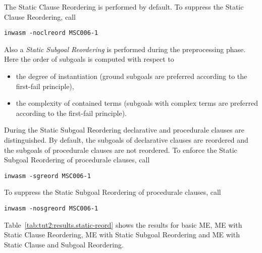The Static Clause Reordering is performed by default. To suppress the
Static Clause Reordering, call
\begin{center}
\begin{verbatim}
inwasm -noclreord MSC006-1
\end{verbatim}
\end{center}

Also a {\em Static Subgoal Reordering\/} is performed during the
preprocessing phase. Here the order of subgoals is computed with
respect to  
\begin{itemize}
\item the degree of instantiation (ground subgoals are preferred
	according to the first-fail principle),
\item the complexity of contained terms (subgoals with complex
	terms are preferred according to the first-fail principle).  
\end{itemize}

During the Static Subgoal Reordering declarative and procedurale
clauses are distinguished. By default, the subgoals of declarative
clauses are reordered and the subgoals of procedurale clauses are not
reordered. To enforce the Static Subgoal Reordering of procedurale
clauses, call
\begin{center}
\begin{verbatim}
inwasm -sgreord MSC006-1
\end{verbatim}
\end{center}
To suppress the Static Subgoal Reordering of procedurale clauses, call
\begin{center}
\begin{verbatim}
inwasm -nosgreord MSC006-1
\end{verbatim}
\end{center}

Table~\ref{tab:tut2:results.static-reord} shows the results for basic
ME, ME with Static Clause Reordering, ME with Static Subgoal
Reordering and ME with Static Clause and Subgoal Reordering.

